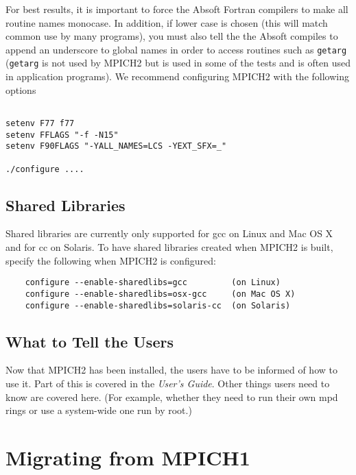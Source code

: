 \documentclass[dvipdfm,11pt]{article}
\begin{document}
For best results, it is important to force the Absoft Fortran compilers to 
make all routine names monocase.  In addition, if lower case is chosen 
(this will match common use by many programs), you must also tell the the 
Absoft compiles to append an underscore to global names in order to access 
routines such as \texttt{getarg} (\texttt{getarg} is not used by MPICH2 but is
used in some 
of the tests and is often used in application programs).  We recommend 
configuring MPICH2 with the following options
\begin{verbatim}

setenv F77 f77
setenv FFLAGS "-f -N15"
setenv F90FLAGS "-YALL_NAMES=LCS -YEXT_SFX=_"

./configure ....

\end{verbatim}




\subsection{Shared Libraries}
\label{sec:shared-libraries}

Shared libraries are currently only supported for gcc on Linux and
Mac OS X and for cc on Solaris. To have shared libraries created when
MPICH2 is built, specify the following when MPICH2 is configured:
\begin{verbatim}
    configure --enable-sharedlibs=gcc         (on Linux)
    configure --enable-sharedlibs=osx-gcc     (on Mac OS X)
    configure --enable-sharedlibs=solaris-cc  (on Solaris)
\end{verbatim}




\subsection{What to Tell the Users}
\label{sec:telling}

Now that MPICH2 has been installed, the users have to be informed of how
to use it.  Part of this is covered in the \emph{User's Guide}.  Other
things users need to know are covered here.  (For example, whether they need to
run their own mpd rings or use a system-wide one run by root.)


\section{Migrating from MPICH1}
\label{sec:migrating}
\end{document}
